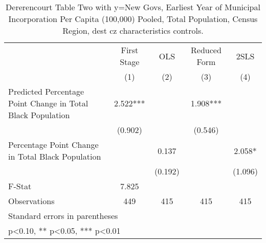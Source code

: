 \begin{table}[htbp]\centering
\def\sym#1{\ifmmode^{#1}\else\(^{#1}\)\fi}
\caption{Dererencourt Table Two with y=New Govs, Earliest Year of Municipal Incorporation Per Capita (100,000) Pooled, Total Population, Census Region, dest cz characteristics controls.}
\begin{tabular}{l*{4}{c}}
\toprule
                    & First Stage   &         OLS   &Reduced Form   &        2SLS   \\
                    &\multicolumn{1}{c}{(1)}   &\multicolumn{1}{c}{(2)}   &\multicolumn{1}{c}{(3)}   &\multicolumn{1}{c}{(4)}   \\
\midrule
Predicted Percentage Point Change in Total Black Population&       2.522***&               &       1.908***&               \\
                    &     (0.902)   &               &     (0.546)   &               \\
\addlinespace
Percentage Point Change in Total Black Population&               &       0.137   &               &       2.058*  \\
                    &               &     (0.192)   &               &     (1.096)   \\
\midrule
F-Stat              &       7.825   &               &               &               \\
Observations        &         449   &         415   &         415   &         415   \\
\bottomrule
\multicolumn{5}{l}{\footnotesize Standard errors in parentheses}\\
\multicolumn{5}{l}{\footnotesize * p<0.10, ** p<0.05, *** p<0.01}\\
\end{tabular}
\end{table}
